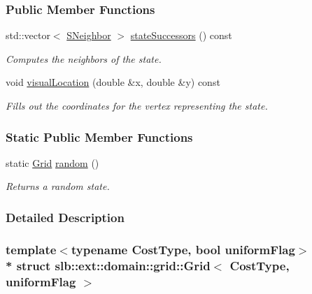 \subsubsection*{Public Member Functions}
\begin{DoxyCompactItemize}
\item 
std\+::vector$<$ \hyperlink{structslb_1_1ext_1_1domain_1_1grid_1_1Grid_a4e0d521edf3400571fd0b09e4de106a9}{S\+Neighbor} $>$ \hyperlink{structslb_1_1ext_1_1domain_1_1grid_1_1Grid_a623d27e882e88ec3cb6fce26424a79a3}{state\+Successors} () const 
\begin{DoxyCompactList}\small\item\em Computes the neighbors of the state. \end{DoxyCompactList}\item 
void \hyperlink{structslb_1_1ext_1_1domain_1_1grid_1_1Grid_aa419a05314d9f6a6376a503a51fcfcb9}{visual\+Location} (double \&x, double \&y) const 
\begin{DoxyCompactList}\small\item\em Fills out the coordinates for the vertex representing the state. \end{DoxyCompactList}\end{DoxyCompactItemize}
\subsubsection*{Static Public Member Functions}
\begin{DoxyCompactItemize}
\item 
static \hyperlink{structslb_1_1ext_1_1domain_1_1grid_1_1Grid}{Grid} \hyperlink{structslb_1_1ext_1_1domain_1_1grid_1_1Grid_acfd3ef8b9c3c5591b6937da526ac7613}{random} ()
\begin{DoxyCompactList}\small\item\em Returns a random state. \end{DoxyCompactList}\end{DoxyCompactItemize}


\subsubsection{Detailed Description}
\subsubsection*{template$<$typename Cost\+Type, bool uniform\+Flag$>$\\*
struct slb\+::ext\+::domain\+::grid\+::\+Grid$<$ Cost\+Type, uniform\+Flag $>$}

